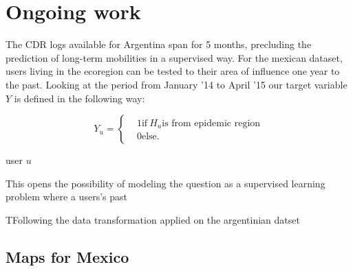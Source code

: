 \section{Ongoing work}

The CDR logs available for Argentina span for 5 months, precluding the prediction of long-term mobilities in a supervised way. For the mexican dataset, users living in the ecoregion can be tested to their area of influence one year to the past. Looking at the period from January '14 to April '15 our target variable $Y $ is defined in the following way: 

\[
    Y_u =
      \begin{cases}
        &1 \mbox{if} \ H_u \mbox{is from epidemic region}\\
        &0 \mbox{else}.
      \end{cases}
    \]

user $u$ 

This opens the possibility of modeling the question as a supervised learning problem where a users's past 

TFollowing the data transformation applied on the argentinian datset

\subsection{Maps for Mexico}